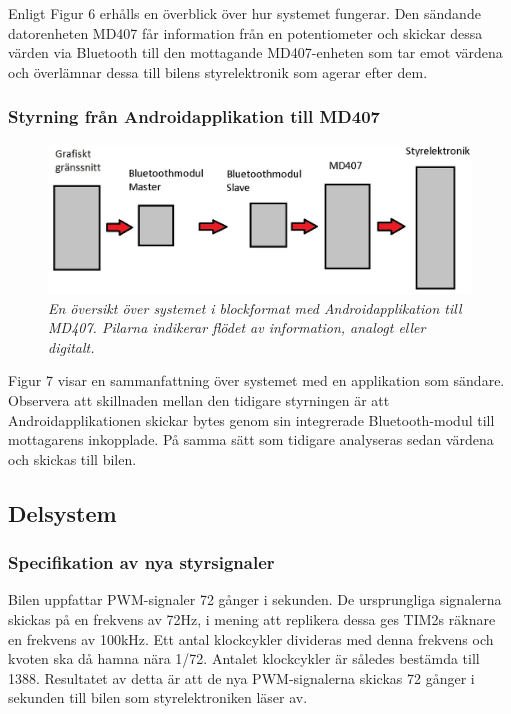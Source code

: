 \documentclass[a4paper]{article}
\begin{document}
Enligt Figur 6 erhålls en överblick över hur systemet fungerar. Den sändande datorenheten MD407 får information från en potentiometer och skickar dessa värden via Bluetooth till den mottagande MD407-enheten som tar emot värdena och överlämnar dessa till bilens styrelektronik som agerar efter dem.

\subsubsection{Styrning från Androidapplikation till MD407}
\begin{figure}[H]
\includegraphics[width=\textwidth]{systemoversiktAndroid.jpg}
\centering
\caption{\it En översikt över systemet i blockformat med Androidapplikation till MD407. Pilarna indikerar flödet av information, analogt eller digitalt.}
\end{figure} 

Figur 7 visar en sammanfattning över systemet med en applikation som sändare. Observera att skillnaden mellan den tidigare styrningen är att Androidapplikationen skickar bytes genom sin integrerade Bluetooth-modul till mottagarens inkopplade. På samma sätt som tidigare analyseras sedan värdena och skickas till bilen.


\subsection{Delsystem}
\subsubsection{Specifikation av nya styrsignaler}
Bilen uppfattar PWM-signaler 72 gånger i sekunden. De ursprungliga signalerna skickas på en frekvens av 72Hz, i mening att replikera dessa ges TIM2s räknare en frekvens av 100kHz. Ett antal klockcykler divideras med denna frekvens och kvoten ska då hamna nära 1/72. Antalet klockcykler är således bestämda till 1388. Resultatet av detta är att de nya PWM-signalerna skickas 72 gånger i sekunden till bilen som styrelektroniken läser av.
\end{document}

